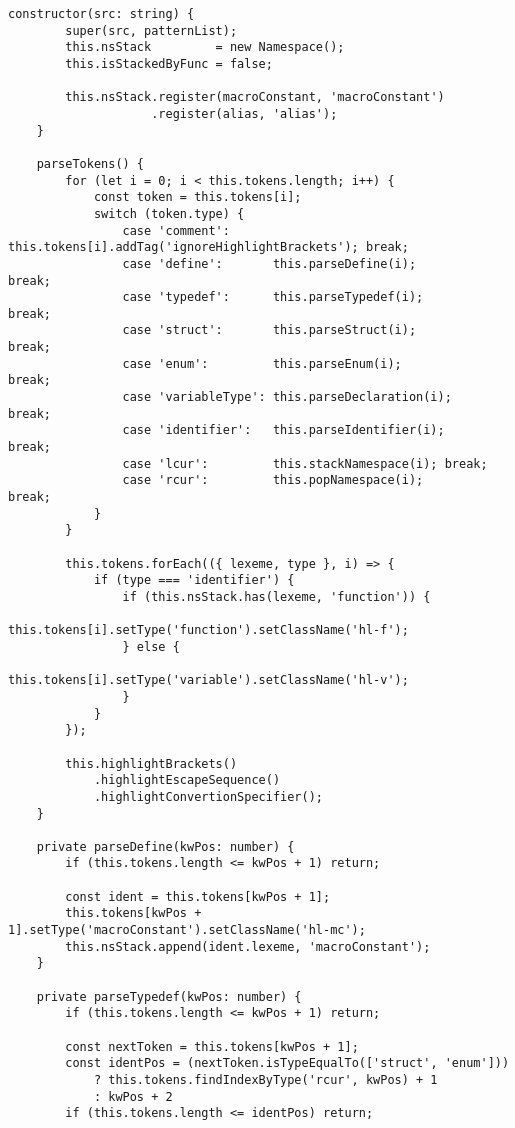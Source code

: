 \documentclass[autodetect-engine,dvi=dvipdfmx,ja=standard,
               a4j,11pt]{bxjsarticle}
\begin{document}
\begin{lstlisting}[caption={Cハイライタ({\tt c.ts})}, label={prog:c}]
    constructor(src: string) {
        super(src, patternList);
        this.nsStack         = new Namespace();
        this.isStackedByFunc = false;

        this.nsStack.register(macroConstant, 'macroConstant')
                    .register(alias, 'alias');
    }

    parseTokens() {
        for (let i = 0; i < this.tokens.length; i++) {
            const token = this.tokens[i];
            switch (token.type) {
                case 'comment':      this.tokens[i].addTag('ignoreHighlightBrackets'); break;
                case 'define':       this.parseDefine(i);                              break;
                case 'typedef':      this.parseTypedef(i);                             break;
                case 'struct':       this.parseStruct(i);                              break;
                case 'enum':         this.parseEnum(i);                                break;
                case 'variableType': this.parseDeclaration(i);                         break;
                case 'identifier':   this.parseIdentifier(i);                          break;
                case 'lcur':         this.stackNamespace(i); break;
                case 'rcur':         this.popNamespace(i);       break;
            }
        }
        
        this.tokens.forEach(({ lexeme, type }, i) => {
            if (type === 'identifier') {
                if (this.nsStack.has(lexeme, 'function')) {
                    this.tokens[i].setType('function').setClassName('hl-f');
                } else {
                    this.tokens[i].setType('variable').setClassName('hl-v');
                }
            }
        });

        this.highlightBrackets()
            .highlightEscapeSequence()
            .highlightConvertionSpecifier();
    }

    private parseDefine(kwPos: number) {
        if (this.tokens.length <= kwPos + 1) return;
        
        const ident = this.tokens[kwPos + 1];
        this.tokens[kwPos + 1].setType('macroConstant').setClassName('hl-mc');
        this.nsStack.append(ident.lexeme, 'macroConstant');
    }

    private parseTypedef(kwPos: number) {
        if (this.tokens.length <= kwPos + 1) return;
        
        const nextToken = this.tokens[kwPos + 1];
        const identPos = (nextToken.isTypeEqualTo(['struct', 'enum'])) 
            ? this.tokens.findIndexByType('rcur', kwPos) + 1
            : kwPos + 2
        if (this.tokens.length <= identPos) return;


\end{lstlisting}
\end{document}
